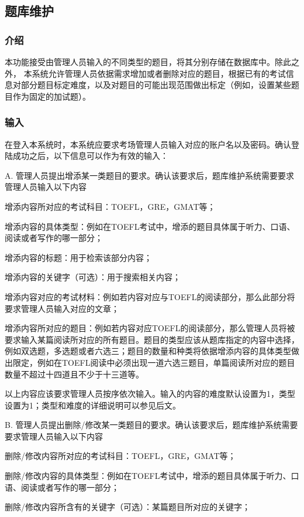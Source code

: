 \subsection{题库维护}

\subsubsection{介绍}
本功能接受由管理人员输入的不同类型的题目，将其分别存储在数据库中。除此之外， 本系统允许管理人员依据需求增加或者删除对应的题目，根据已有的考试信息对部分题目标定难度，以及对题目的可能出现范围做出标定（例如，设置某些题目作为固定的加试题）。

\subsubsection{输入}
在登入本系统时，本系统应要求考场管理人员输入对应的账户名以及密码。确认登陆成功之后，以下信息可以作为有效的输入：

A. 管理人员提出增添某一类题目的要求。确认该要求后，题库维护系统需要要求管理人员输入以下内容

	增添内容所对应的考试科目：TOEFL，GRE，GMAT等；

	增添内容的具体类型：例如在TOEFL考试中，增添的题目具体属于听力、口语、阅读或者写作的哪一部分；

	增添内容的标题：用于检索该部分内容；

	增添内容的关键字（可选）：用于搜索相关内容；

	增添内容对应的考试材料：例如若内容对应与TOEFL的阅读部分，那么此部分将要求管理人员输入对应的文章；

	增添内容所对应的题目：例如若内容对应TOEFL的阅读部分，那么管理人员将被要求输入某篇阅读所对应的所有题目。题目的类型应该从题库指定的内容中选择，例如双选题，多选题或者六选三；题目的数量和种类将依据增添内容的具体类型做出限定，例如在TOEFL阅读中必须出现一道六选三题目，单篇阅读所对应的题目数量不超过十四道且不少于十三道等。

以上内容应该要求管理人员按序依次输入。输入的内容的难度默认设置为1，类型设置为1；类型和难度的详细说明可以参见后文。

B. 管理人员提出删除/修改某一类题目的要求。确认该要求后，题库维护系统需要要求管理人员输入以下内容

	删除/修改内容所对应的考试科目：TOEFL，GRE，GMAT等；

	删除/修改内容的具体类型：例如在TOEFL考试中，增添的题目具体属于听力、口语、阅读或者写作的哪一部分；

	删除/修改内容所含有的关键字（可选）：某篇题目所对应的关键字；

